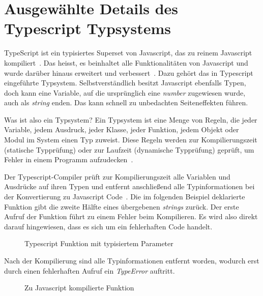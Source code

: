 
\section{Ausgewählte Details des Typescript Typsystems}
TypeScript ist ein typisiertes Superset von Javascript, das zu reinem Javascript kompiliert~\cite{typescript}.
Das heisst, es beinhaltet alle Funktionalitäten von Javascript und wurde darüber hinaus erweitert und verbessert~\cite{superset}.
Dazu gehört das in Typescript eingeführte Typsystem. Selbstverständlich besitzt Javascript ebenfalls Typen, doch kann eine Variable,
auf die ursprünglich eine \emph{number} zugewiesen wurde, auch als \emph{string} enden. Das kann schnell zu unbedachten Seiteneffekten führen.

Was ist also ein Typsystem? Ein Typsystem ist eine Menge von Regeln, die jeder Variable, jedem Ausdruck, jeder Klasse,
jeder Funktion, jedem Objekt oder Modul im System einen Typ zuweist.
Diese Regeln werden zur  Kompilierungszeit (statische Typprüfung) oder zur Laufzeit (dynamische Typprüfung) geprüft,
um Fehler in einem Programm aufzudecken~\cite{typescript-typesystem-medium}.

Der Typescript-Compiler prüft zur Kompilierungszeit alle Variablen und Ausdrücke auf ihren Typen und entfernt anschließend alle Typinformationen
bei der Konvertierung zu Javascript Code~\cite{typescript-github-specification}.
Die im folgenden Beispiel deklarierte Funktion gibt die zweite Hälfte eines übergebenen \emph{strings} zurück.
Der erste Aufruf der Funktion führt zu einem Fehler beim Kompilieren. Es wird also direkt darauf hingewiesen, dass es sich um ein fehlerhaften Code handelt.

\begin{figure}[h]
    
    \caption{Typescript Funktion mit typisiertem Parameter}
    \label{fig:basics:typescript:1}
\end{figure}

Nach der Kompilierung sind alle Typinformationen entfernt worden, wodurch erst durch einen fehlerhaften Aufruf
ein \emph{TypeError} auftritt.

\begin{figure}[h]
    
    \caption{Zu Javascript kompilierte Funktion}
    \label{fig:basics:typescript:2}
\end{figure}

